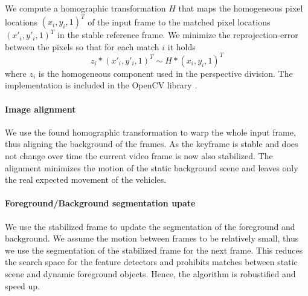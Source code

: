 We compute a homographic transformation $H$ that maps the homogeneous pixel locations $(x_i, y_i, 1)^T$ of the input frame to the matched pixel locations $(x'_i, y'_i, 1)^T$ in the stable reference frame.
We minimize the reprojection-error between the pixels so that for each match $i$ it holds
\begin{equation}
 z_i  * (x'_i, y'_i, 1)^T \sim H * (x_i, y_i, 1)^T
 \label{eq:homographic_transformation}
\end{equation}
where $z_i$ is the homogeneous component used in the perspective division. 
The implementation is included in the OpenCV library \cite{opencv_library}.


\paragraph{Image alignment}
We use the found homographic transformation to warp the whole input frame, thus aligning the background of the frames.
As the keyframe is stable and does not change over time the current video frame is now also stabilized.
The alignment minimizes the motion of the static background scene and leaves only the real expected movement of the vehicles.


\paragraph{Foreground/Background segmentation upate}
We use the stabilized frame to update the segmentation of the foreground and background.
We assume the motion between frames to be relatively small, thus we use the segmentation of the stabilized frame for the next frame.
This reduces the search space for the feature detectors and prohibits matches between static scene and dynamic foreground objects. 
Hence, the algorithm is robustified and speed up.
